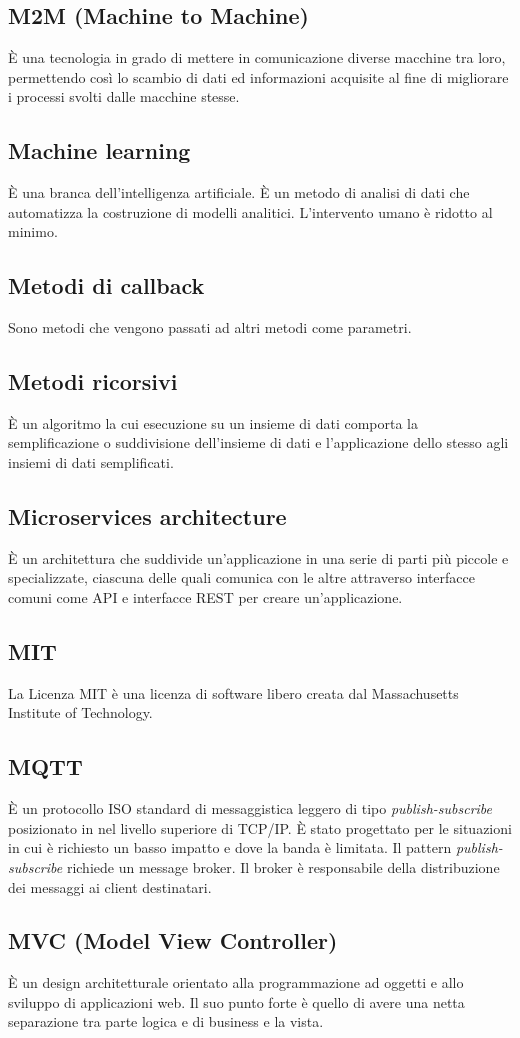 \section{}

\subsection*{M2M (Machine to Machine)} È una tecnologia in grado di mettere in comunicazione diverse macchine tra loro, permettendo così lo scambio di dati ed informazioni acquisite al fine di migliorare i processi svolti dalle macchine stesse.

\subsection*{Machine learning} È una branca dell'intelligenza artificiale. È un metodo di analisi di dati che automatizza la costruzione di modelli analitici. L'intervento umano è ridotto al minimo.

\subsection*{Metodi di callback} Sono metodi che vengono passati ad altri metodi come parametri.

\subsection*{Metodi ricorsivi} È un algoritmo la cui esecuzione su un insieme di dati comporta la semplificazione o suddivisione dell'insieme di dati e l'applicazione dello stesso agli insiemi di dati semplificati.

\subsection*{Microservices architecture} È un architettura che suddivide un’applicazione in una serie di parti più piccole e specializzate, ciascuna delle quali comunica con le altre attraverso interfacce comuni come API e interfacce REST per creare un’applicazione.

\subsection*{MIT} La Licenza MIT è una licenza di software libero creata dal Massachusetts Institute of Technology.

\subsection*{MQTT} È un protocollo ISO standard di messaggistica leggero di tipo \textit{publish-subscribe} posizionato in nel livello superiore di TCP/IP. È stato progettato per le situazioni in cui è richiesto un basso impatto e dove la banda è limitata. Il pattern \textit{publish-subscribe} richiede un message broker. Il broker è responsabile della distribuzione dei messaggi ai client destinatari.

\subsection*{MVC (Model View Controller)} È un design architetturale orientato alla programmazione ad oggetti  e allo sviluppo di applicazioni web. Il suo punto forte è quello di avere una netta separazione tra parte logica e di business e la vista.